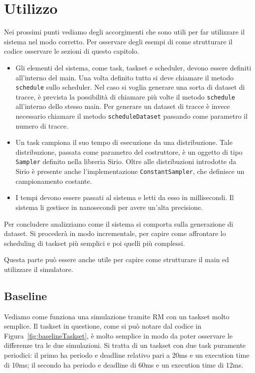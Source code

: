 \chapter{Utilizzo}
Nei prossimi punti vediamo degli accorgimenti che sono utili per far utilizzare il sistema nel modo corretto. Per osservare degli esempi di come strutturare il codice osservare le sezioni di questo capitolo.
\begin{itemize}
    \item Gli elementi del sistema, come task, taskset e scheduler, devono essere definiti all'interno del main. Una volta definito tutto si deve chiamare il metodo \texttt{schedule} sullo scheduler. Nel caso si voglia generare una sorta di dataset di tracce, è prevista la possibilità di chiamare più volte il metodo \texttt{schedule} all'interno dello stesso main. Per generare un dataset di tracce è invece necessario chiamare il metodo \texttt{scheduleDataset} passando come parametro il numero di tracce.
    \item Un task campiona il suo tempo di esecuzione da una distribuzione. Tale distribuzione, passata come parametro del costruttore, è un oggetto di tipo \texttt{Sampler} definito nella libreria Sirio. Oltre alle distribuzioni introdotte da Sirio è presente anche l'implementazione \texttt{ConstantSampler}, che definisce un campionamento costante.
    \item I tempi devono essere passati al sistema e letti da esso in millisecondi. Il sistema li gestisce in nanosecondi per avere un'alta precisione.
\end{itemize}
Per concludere analizziamo come il sistema si comporta sulla generazione di dataset. Si procederà in modo incrementale, per capire come affrontare lo scheduling di taskset più semplici e poi quelli più complessi.

Questa parte può essere anche utile per capire come strutturare il main ed utilizzare il simulatore.

\section{Baseline}
Vediamo come funziona una simulazione tramite RM con un taskset molto semplice. Il taskset in questione, come si può notare dal codice in Figura~\ref{fig:baselineTaskset}, è molto semplice in modo da poter osservare le differenze tra le due simulazioni. Si tratta di un taskset con due task puramente periodici: il primo ha periodo e deadline relativo pari a 20ms e un execution time di 10ms; il secondo ha periodo e deadline di 60ms e un execution time di 12ms.

